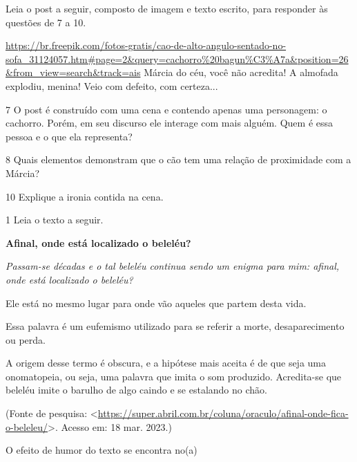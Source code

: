 Leia o post a seguir, composto de imagem e texto escrito, para responder
às questões de 7 a 10.

\url{https://br.freepik.com/fotos-gratis/cao-de-alto-angulo-sentado-no-sofa_31124057.htm\#page=2\&query=cachorro\%20bagun\%C3\%A7a\&position=26\&from_view=search\&track=ais}
Márcia do céu, você não acredita! A almofada explodiu, menina! Veio com
defeito, com certeza...

\num{7} O post é construído com uma cena e contendo apenas uma
personagem: o cachorro. Porém, em seu discurso ele interage com mais
alguém. Quem é essa pessoa e o que ela representa?



\num{8} Quais elementos demonstram que o cão tem uma relação de
proximidade com a Márcia?



\num{10} Explique a ironia contida na cena.




\num{1} Leia o texto a seguir.

\textbf{Afinal, onde está localizado o beleléu?}

\emph{Passam-se décadas e o tal beleléu continua sendo um enigma para
mim: afinal, onde está localizado o beleléu?}

Ele está no mesmo lugar para onde vão aqueles que partem desta vida.

Essa palavra é um eufemismo utilizado para se referir a morte,
desaparecimento ou perda.

A origem desse termo é obscura, e a hipótese mais aceita é de que seja
uma onomatopeia, ou seja, uma palavra que imita o som produzido.
Acredita-se que beleléu imite o barulho de algo caindo e se estalando no
chão.

(Fonte de pesquisa:
\textless{}\url{https://super.abril.com.br/coluna/oraculo/afinal-onde-fica-o-beleleu/}\textgreater.
Acesso em: 18 mar. 2023.)

O efeito de humor do texto se encontra no(a)


